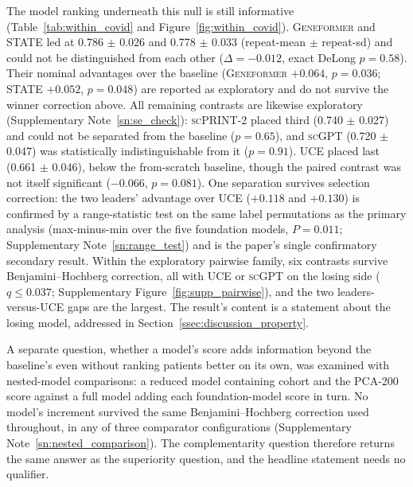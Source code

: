 \documentclass[11pt,a4paper]{article}
\newcommand{\model}[1]{\textsc{#1}}
\begin{document}
The model ranking underneath this null is still informative
(Table~\ref{tab:within_covid} and Figure~\ref{fig:within_covid}). \model{Geneformer} and \model{STATE} led at
0.786 $\pm$ 0.026 and 0.778 $\pm$ 0.033 (repeat-mean $\pm$ repeat-sd) and
could not be distinguished from each other ($\Delta = -0.012$, exact DeLong
$p = 0.58$). Their nominal advantages over the baseline (\model{Geneformer}
$+0.064$, $p = 0.036$; \model{STATE} $+0.052$, $p = 0.048$) are reported as
exploratory and do not survive the winner correction above. All remaining
contrasts are likewise exploratory
(Supplementary Note~\ref{sn:se_check}):
\model{scPRINT-2} placed third (0.740 $\pm$ 0.027) and could not be separated
from the baseline ($p = 0.65$), and \model{scGPT} (0.720 $\pm$ 0.047) was
statistically indistinguishable from it ($p = 0.91$). \model{UCE} placed last
(0.661 $\pm$ 0.046), below the from-scratch baseline, though the paired
contrast was not itself significant ($-0.066$, $p = 0.081$). One separation
survives selection correction: the two leaders' advantage over \model{UCE}
($+0.118$ and $+0.130$) is confirmed by a range-statistic test on the same
label permutations as the primary analysis (max-minus-min over the five
foundation models, $P = 0.011$; Supplementary Note~\ref{sn:range_test}) and
is the paper's single confirmatory secondary result. Within the exploratory
pairwise family, six contrasts survive Benjamini--Hochberg correction, all
with \model{UCE} or \model{scGPT} on the losing side ($q \leq 0.037$;
Supplementary Figure~\ref{fig:supp_pairwise}), and the two
leaders-versus-\model{UCE} gaps are the largest. The result's content is a
statement about the losing model, addressed in
Section~\ref{ssec:discussion_property}.

A separate question, whether a model's score adds information beyond the
baseline's even without ranking patients better on its own, was examined with
nested-model comparisons: a reduced model containing cohort and the PCA-200
score against a full model adding each foundation-model score in turn. No
model's increment survived the same Benjamini--Hochberg correction used
throughout, in any of three comparator configurations
(Supplementary Note~\ref{sn:nested_comparison}). The complementarity question
therefore returns the same answer as the superiority question, and the
headline statement needs no qualifier.
\end{document}
